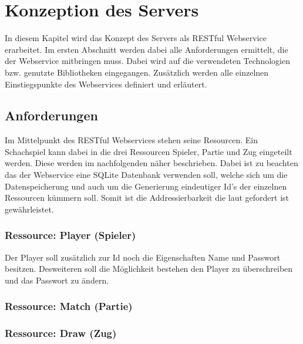 
\chapter{Konzeption des Servers}
In diesem Kapitel wird das Konzept des Servers als RESTful Webservice erarbeitet. Im ersten Abschnitt werden dabei alle Anforderungen ermittelt, die der Webservice mitbringen muss.
Dabei wird auf die verwendeten Technologien bzw. genutzte Bibliotheken eingegangen. Zusätzlich werden alle einzelnen Einstiegspunkte des Webservices definiert und erläutert. 

\section{Anforderungen}
Im Mittelpunkt des RESTful Webservices stehen seine Resourcen. Ein Schachspiel kann dabei in die drei Ressourcen Spieler, Partie und Zug eingeteilt werden. Diese werden im nachfolgenden näher beschrieben. Dabei ist zu beachten das der Webservice eine SQLite Datenbank verwenden soll, welche sich um die Datenspeicherung und auch um die Generierung eindeutiger Id's der einzelnen Ressourcen kümmern soll. Somit ist die Addressierbarkeit die laut \cite[7]{kretzschmar}  gefordert ist gewährleistet.

\subsection{Ressource: Player (Spieler)}
Der Player soll zusätzlich zur Id noch die Eigenschaften Name und Passwort besitzen. Desweiteren soll die Möglichkeit bestehen den Player zu überschreiben und das Passwort zu ändern.
\begin{figure} [H]
\centering
{}	
\end{figure}

\subsection{Ressource: Match (Partie)}

\subsection{Ressource: Draw (Zug)}
